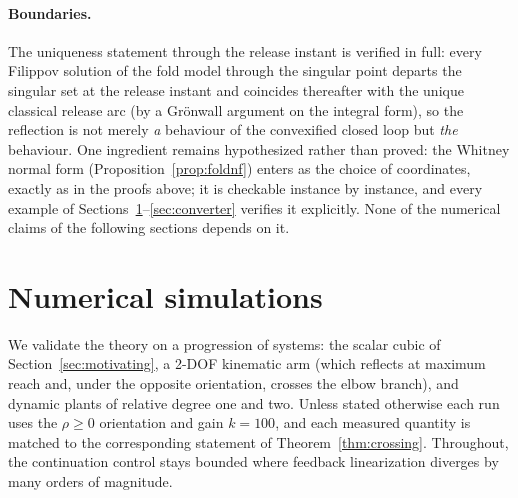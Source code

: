 \documentclass[11pt,american]{article}
\theoremstyle{definition}
\theoremstyle{plain}
\theoremstyle{remark}
\begin{document}
\paragraph{Boundaries.} The uniqueness statement through the release instant is verified in full: every Filippov solution of the fold model through the singular point departs the singular set at the release instant and coincides thereafter with the unique classical release arc (by a Gr\"onwall argument on the integral form), so the reflection is not merely \emph{a} behaviour of the convexified closed loop but \emph{the} behaviour. One ingredient remains hypothesized rather than proved: the Whitney normal form (Proposition~\ref{prop:foldnf}) enters as the choice of coordinates, exactly as in the proofs above; it is checkable instance by instance, and every example of Sections~\ref{sec:sims}--\ref{sec:converter} verifies it explicitly. None of the numerical claims of the following sections depends on it.

\section{Numerical simulations}\label{sec:sims}

We validate the theory on a progression of systems: the scalar cubic of Section~\ref{sec:motivating}, a 2-DOF kinematic arm (which reflects at maximum reach and, under the opposite orientation, crosses the elbow branch), and dynamic plants of relative degree one and two. Unless stated otherwise each run uses the $\rho\ge0$ orientation and gain $k=100$, and each measured quantity is matched to the corresponding statement of Theorem~\ref{thm:crossing}. Throughout, the continuation control stays bounded where feedback linearization diverges by many orders of magnitude.
\end{document}
